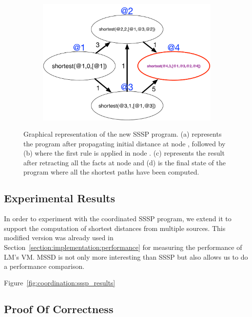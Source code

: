 \begin{figure}
\begin{center}
\begin{subfigure}[b]{0.4\textwidth}
      \caption{}
   \end{subfigure}
   \begin{subfigure}[b]{0.4\textwidth}
      \includegraphics[width=\textwidth]{figures/sssp/coord4}
      \caption{}
   \end{subfigure}
\end{center}
\caption{Graphical representation of the new SSSP program. (a) represents the
   program after propagating initial distance at node , followed by
   (b) where the first rule is applied in node . (c)
   represents the result after retracting all the  facts at node
    and (d) is the final state of the program where all the shortest paths
   have been computed.}
\label{fig:coordination:new_sssp}
\end{figure}

\subsection{Experimental Results}

In order to experiment with the coordinated SSSP program, we extend it to
support the computation of shortest distances from multiple sources. This
modified version was already used in
Section~\ref{section:implementation:performance} for measuring the performance
of LM's VM. MSSD is not only more interesting than SSSP but also allows us to do
a performance comparison.

Figure~\ref{fig:coordination:sssp_results}

\subsection{Proof Of Correctness}

